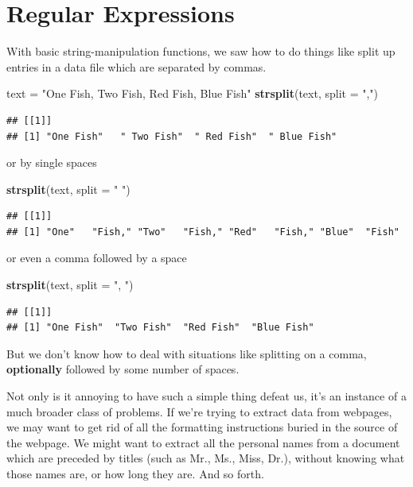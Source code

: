 \documentclass[
]{book}
\newenvironment{Shaded}{\begin{snugshade}}{\end{snugshade}}
\newcommand{\DataTypeTok}[1]{\textcolor[rgb]{0.13,0.29,0.53}{#1}}
\newcommand{\KeywordTok}[1]{\textcolor[rgb]{0.13,0.29,0.53}{\textbf{#1}}}
\newcommand{\NormalTok}[1]{#1}
\newcommand{\StringTok}[1]{\textcolor[rgb]{0.31,0.60,0.02}{#1}}
\begin{document}
\hypertarget{Regex}{%
\chapter{Regular Expressions}\label{Regex}}

With basic string-manipulation functions, we saw how to do things like split
up entries in a data file which are separated by commas.

\begin{Shaded}
\begin{Highlighting}[]
\NormalTok{text =}\StringTok{ "One Fish, Two Fish, Red Fish, Blue Fish"}
\KeywordTok{strsplit}\NormalTok{(text, }\DataTypeTok{split =} \StringTok{","}\NormalTok{)}
\end{Highlighting}
\end{Shaded}

\begin{verbatim}
## [[1]]
## [1] "One Fish"   " Two Fish"  " Red Fish"  " Blue Fish"
\end{verbatim}

or by single spaces

\begin{Shaded}
\begin{Highlighting}[]
\KeywordTok{strsplit}\NormalTok{(text, }\DataTypeTok{split =} \StringTok{" "}\NormalTok{)}
\end{Highlighting}
\end{Shaded}

\begin{verbatim}
## [[1]]
## [1] "One"   "Fish," "Two"   "Fish," "Red"   "Fish," "Blue"  "Fish"
\end{verbatim}

or even a comma followed by a space

\begin{Shaded}
\begin{Highlighting}[]
\KeywordTok{strsplit}\NormalTok{(text, }\DataTypeTok{split =} \StringTok{", "}\NormalTok{)}
\end{Highlighting}
\end{Shaded}

\begin{verbatim}
## [[1]]
## [1] "One Fish"  "Two Fish"  "Red Fish"  "Blue Fish"
\end{verbatim}

But we don't know how to deal with situations like splitting on a comma,
\textbf{optionally} followed by some number of spaces.

Not only is it annoying to have such a simple thing defeat us, it's an instance
of a much broader class of problems. If we're trying to extract data from webpages, we may want to get rid of all the formatting instructions buried in the source of the webpage. We might want to extract all the personal names from
a document which are preceded by titles (such as Mr., Ms., Miss, Dr.), without
knowing what those names are, or how long they are. And so forth.
\end{document}

